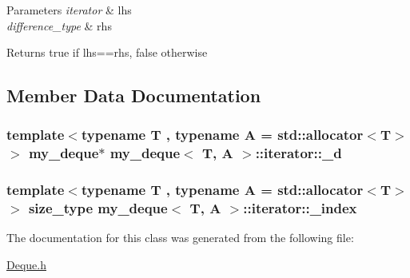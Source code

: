 \begin{DoxyParams}{Parameters}
{\em iterator} & lhs \\
\hline
{\em difference\-\_\-type} & rhs \\
\hline
\end{DoxyParams}
\begin{DoxyReturn}{Returns}
true if lhs==rhs, false otherwise 
\end{DoxyReturn}


\subsection{Member Data Documentation}
\hypertarget{classmy__deque_1_1iterator_a69df69b162f6a0fb1f6e59bdccb639c4}{
\subsubsection[{\-\_\-d}]{\setlength{\rightskip}{0pt plus 5cm}template$<$typename T , typename A  = std\-::allocator$<$\-T$>$$>$ {\bf my\-\_\-deque}$\ast$ {\bf my\-\_\-deque}$<$ T, A $>$\-::iterator\-::\-\_\-d\hspace{0.3cm}{\ttfamily [private]}}}\label{classmy__deque_1_1iterator_a69df69b162f6a0fb1f6e59bdccb639c4}
\hypertarget{classmy__deque_1_1iterator_a41f01f39f26a404b45742e43c3352917}{
\subsubsection[{\-\_\-index}]{\setlength{\rightskip}{0pt plus 5cm}template$<$typename T , typename A  = std\-::allocator$<$\-T$>$$>$ {\bf size\-\_\-type} {\bf my\-\_\-deque}$<$ T, A $>$\-::iterator\-::\-\_\-index\hspace{0.3cm}{\ttfamily [private]}}}\label{classmy__deque_1_1iterator_a41f01f39f26a404b45742e43c3352917}


The documentation for this class was generated from the following file\-:\begin{DoxyCompactItemize}
\item 
\hyperlink{Deque_8h}{Deque.\-h}\end{DoxyCompactItemize}
